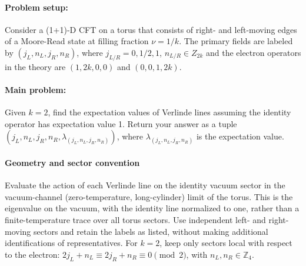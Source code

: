 \documentclass[11pt]{article}
\begin{document}
\paragraph*{Problem setup:}
Consider a (1+1)-D CFT on a torus that consists of right- and left-moving edges of a Moore-Read state at filling fraction $\nu=1/k$. The primary fields are labeled by $(j_L,n_L,j_R,n_R)$, where $j_{L/R}=0,1/2,1$, $n_{L/R}\in Z_{2k}$  and the electron operators in the theory are $(1,2k,0,0)$ and $(0,0,1,2k)$.

\paragraph*{Main problem:}
Given $k=2$, find the expectation values of Verlinde lines assuming the identity operator has expectation value 1. Return your answer as a tuple $(j_L,n_L,j_R,n_R,\lambda_{(j_L,n_L,j_R,n_R)})$, where $\lambda_{(j_L,n_L,j_R,n_R)}$ is the expectation value.

\paragraph*{Geometry and sector convention}
Evaluate the action of each Verlinde line on the identity vacuum sector in
the vacuum-channel (zero-temperature, long-cylinder) limit of the torus.
This is the eigenvalue on the vacuum, with the identity line normalized to
one, rather than a finite-temperature trace over all torus sectors.
Use independent left- and right-moving sectors and retain the labels as
listed, without making additional identifications of representatives.
For $k=2$, keep only sectors local with respect to the electron:
$2j_L+n_L\equiv2j_R+n_R\equiv0\pmod2$, with $n_L,n_R\in\mathbb Z_4$.
\end{document}
